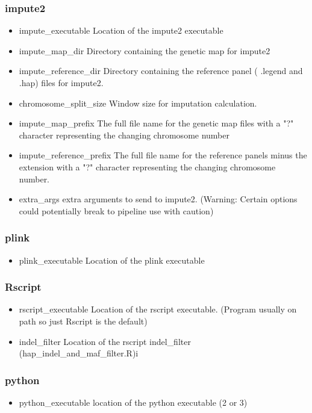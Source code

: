 \documentclass[a4paper,10pt]{article}
\begin{document}
\subsubsection{impute2}
\begin{itemize}
\item impute\_executable 
Location of the impute2 executable
\item impute\_map\_dir
Directory containing the genetic map for impute2
\item impute\_reference\_dir 
Directory containing the reference panel ( .legend and .hap) files for impute2.
\item chromosome\_split\_size
Window size for imputation calculation.
\item impute\_map\_prefix
The full file name for the genetic map files with a "?" character representing the changing chromosome number
\item impute\_reference\_prefix
The full file name for the reference panels minus the extension with a "?" character representing the changing chromosome number.
\item extra\_args extra arguments to send to impute2. (Warning: Certain options could potentially break to pipeline use with caution)
\end{itemize}
\subsubsection{plink}
\begin{itemize}
\item plink\_executable 
Location of the plink executable
\end{itemize}
\subsubsection{Rscript}
\begin{itemize}
\item rscript\_executable
Location of the rscript executable. (Program usually on path so just Rscript is the default)
\item indel\_filter
Location of the rscript indel\_filter (hap\_indel\_and\_maf\_filter.R)i
\end{itemize}
\subsubsection{python}
\begin{itemize}
\item python\_executable 
location of the python executable (2 or 3)
\end{itemize}
\end{document}
